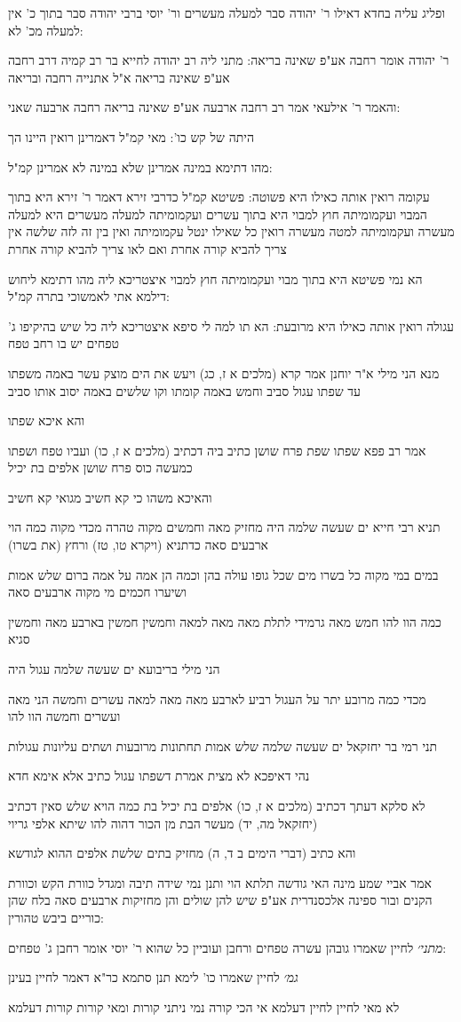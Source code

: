 \documentclass[12pt, openany]{book}
\newcommand{\sethebfont}{
\fontsize{10.5pt}{21.0pt} \selectfont
}
\newcommand{\textblock}[1]{
{\sethebfont #1\\}	
}
\begin{document}
\textblock{ופליג עליה בחדא דאילו ר' יהודה סבר למעלה מעשרים ור' יוסי ברבי יהודה סבר בתוך כ' אין למעלה מכ' לא:}
\textblock{ר' יהודה אומר רחבה אע"פ שאינה בריאה: מתני ליה רב יהודה לחייא בר רב קמיה דרב רחבה אע"פ שאינה בריאה א"ל אתנייה רחבה ובריאה}
\textblock{והאמר ר' אילעאי אמר רב רחבה ארבעה אע"פ שאינה בריאה רחבה ארבעה שאני:}
\textblock{היתה של קש כו': מאי קמ"ל דאמרינן רואין היינו הך}
\textblock{מהו דתימא במינה אמרינן שלא במינה לא אמרינן קמ"ל:}
\textblock{עקומה רואין אותה כאילו היא פשוטה: פשיטא קמ"ל כדרבי זירא דאמר ר' זירא היא בתוך המבוי ועקמומיתה חוץ למבוי היא בתוך עשרים ועקמומיתה למעלה מעשרים היא למעלה מעשרה ועקמומיתה למטה מעשרה רואין כל שאילו ינטל עקמומיתה ואין בין זה לזה שלשה אין צריך להביא קורה אחרת ואם לאו צריך להביא קורה אחרת}
\textblock{הא נמי פשיטא היא בתוך מבוי ועקמומיתה חוץ למבוי איצטריכא ליה מהו דתימא ליחוש דילמא אתי לאמשוכי בתרה קמ"ל:}
\textblock{עגולה רואין אותה כאילו היא מרובעת: הא תו למה לי סיפא איצטריכא ליה כל שיש בהיקיפו ג' טפחים יש בו רחב טפח}
\textblock{מנא הני מילי א"ר יוחנן אמר קרא (מלכים א ז, כג) ויעש את הים מוצק עשר באמה משפתו עד שפתו עגול סביב וחמש באמה קומתו וקו שלשים באמה יסוב אותו סביב}
\textblock{והא איכא שפתו}
\textblock{אמר רב פפא שפתו שפת פרח שושן כתיב ביה דכתיב (מלכים א ז, כו) ועביו טפח ושפתו כמעשה כוס פרח שושן אלפים בת יכיל}
\textblock{והאיכא משהו כי קא חשיב מגואי קא חשיב}
\textblock{תניא רבי חייא ים שעשה שלמה היה מחזיק מאה וחמשים מקוה טהרה מכדי מקוה כמה הוי ארבעים סאה כדתניא (ויקרא טו, טז) ורחץ (את בשרו)}
\textblock{במים במי מקוה כל בשרו מים שכל גופו עולה בהן וכמה הן אמה על אמה ברום שלש אמות ושיערו חכמים מי מקוה ארבעים סאה}
\textblock{כמה הוו להו חמש מאה גרמידי לתלת מאה מאה למאה וחמשין חמשין בארבע מאה וחמשין סגיא}
\textblock{הני מילי בריבועא ים שעשה שלמה עגול היה}
\textblock{מכדי כמה מרובע יתר על העגול רביע לארבע מאה מאה למאה עשרים וחמשה הני מאה ועשרים וחמשה הוו להו}
\textblock{תני רמי בר יחזקאל ים שעשה שלמה שלש אמות תחתונות מרובעות ושתים עליונות עגולות}
\textblock{נהי דאיפכא לא מצית אמרת דשפתו עגול כתיב אלא אימא חדא}
\textblock{לא סלקא דעתך דכתיב (מלכים א ז, כו) אלפים בת יכיל בת כמה הויא שלש סאין דכתיב (יחזקאל מה, יד) מעשר הבת מן הכור דהוה להו שיתא אלפי גריוי}
\textblock{והא כתיב (דברי הימים ב ד, ה) מחזיק בתים שלשת אלפים ההוא לגודשא}
\textblock{אמר אביי שמע מינה האי גודשה תלתא הוי ותנן נמי שידה תיבה ומגדל כוורת הקש וכוורת הקנים ובור ספינה אלכסנדרית אע"פ שיש להן שולים והן מחזיקות ארבעים סאה בלח שהן כוריים ביבש טהורין:}
\textblock{{\large\emph{מתני׳}} לחיין שאמרו גובהן עשרה טפחים ורחבן ועוביין כל שהוא ר' יוסי אומר רחבן ג' טפחים:}
\textblock{{\large\emph{גמ׳}} לחיין שאמרו כו' לימא תנן סתמא כר"א דאמר לחיין בעינן}
\textblock{לא מאי לחיין לחיין דעלמא אי הכי קורה נמי ניתני קורות ומאי קורות קורות דעלמא}
\end{document}
